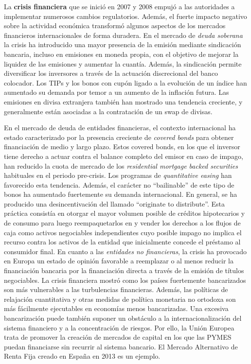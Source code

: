 \documentclass{nuevotema}
\begin{document}
La \textbf{crisis financiera} que se inició en 2007 y 2008 empujó a las autoridades a implementar numerosos cambios regulatorios. Además, el fuerte impacto negativo sobre la actividad económica transformó algunos aspectos de los mercados financieros internacionales de forma duradera. En el mercado de \textit{deuda soberana} la crisis ha introducido una mayor presencia de la emisión mediante sindicación bancaria, incluso en emisiones en moneda propia, con el objetivo de mejorar la liquidez de las emisiones y aumentar la cuantía. Además, la sindicación permite diversificar los inversores a través de la actuación discrecional del banco colocador. Los TIPs y los bonos con cupón ligado a la evolución de un índice han aumentado su demanda por temor a un aumento de la inflación futura. Las emisiones en divisa extranjera también han mostrado una tendencia creciente, y generalmente están asociadas a la contratación de un swap de divisas. 

En el mercado de deuda de entidades financieras, el contexto internacional ha estado caracterizado por la presencia creciente de \textit{covered bonds} para obtener financiación de medio y largo plazo. Estos covered bonds, en los que el inversor tiene derecho a actuar contra el balance completo del emisor en caso de impago, han reducido la cuota de mercado de los \textit{residential mortgage backed securities} habituales en el periodo pre-crisis. Los programas de \textit{quantitative easing} han favorecido esta tendencia. Además, el carácter no ``bailinable'' de este tipo de bonos ha aumentado fuertemente su demanda internacional. En general, se ha producido una desincentivación del llamado ``originate to distribute''. Esta práctica consistía en otorgar el mayor volumen posible de créditos hipotecarios y de consumo para luego reempaquetarlos en y vender los derechos a los flujos de caja como activos negociables independientes cuyo posible impago no implica el recurso contra los activos de la entidad que inicialmente concede el préstamo al consumidor final. En cuanto a las \textit{entidades no financieras}, la crisis ha provocado en Europa un estado de opinión favorable a reemplazar o al menos reducir la financiación bancaria por la financiación directa a través de la emisión de títulos negociables. La crisis financiera mostró como los países fuertemente bancarizados son más vulnerables a las turbulencias financieras. Además, las políticas de relajación cuantitativa y otras medidas de política monetaria no ortodoxa son más fácilmente ejecutables en economías menos bancarizadas. Una excesiva bancarización puede también suponer un obstáculo a la internacionalización del sistema financiero y a la concentración de riesgos. Por ello, la Unión Europea trata de promover la creación de mercados de capital en los que las PYMES puedan financiarse sin recurrir al sistema bancario. El Mercado Alternativo de Renta Fija creado en España en 2013 es un ejemplo.
\end{document}
